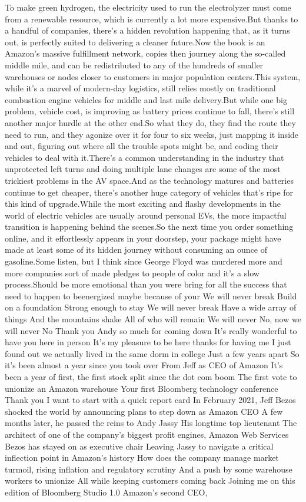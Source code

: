 \documentclass{article}%
\begin{document}
To make green hydrogen, the electricity used to run the electrolyzer must come from a renewable resource, which is currently a lot more expensive.But thanks to a handful of companies, there's a hidden revolution happening that, as it turns out, is perfectly suited to delivering a cleaner future.Now the book is an Amazon's massive fulfillment network, copies then journey along the so{-}called middle mile, and can be redistributed to any of the hundreds of smaller warehouses or nodes closer to customers in major population centers.This system, while it's a marvel of modern{-}day logistics, still relies mostly on traditional combustion engine vehicles for middle and last mile delivery.But while one big problem, vehicle cost, is improving as battery prices continue to fall, there's still another major hurdle at the other end.So what they do, they find the route they need to run, and they agonize over it for four to six weeks, just mapping it inside and out, figuring out where all the trouble spots might be, and coding their vehicles to deal with it.There's a common understanding in the industry that unprotected left turns and doing multiple lane changes are some of the most trickiest problems in the AV space.And as the technology matures and batteries continue to get cheaper, there's another huge category of vehicles that's ripe for this kind of upgrade.While the most exciting and flashy developments in the world of electric vehicles are usually around personal EVs, the more impactful transition is happening behind the scenes.So the next time you order something online, and it effortlessly appears in your doorstep, your package might have made at least some of its hidden journey without consuming an ounce of gasoline.Some listen, but I think since George Floyd was murdered more and more companies sort of made pledges to people of color and it's a slow process.Should be more emotional than you were bring for all the success that need to happen to beenergized maybe because of your We will never break Build on a foundation Strong enough to stay We will never break Have a wide array of things And the mountains shake All of who will remain We will never No, now we will never No Thank you Andy so much for coming down It's really wonderful to have you here in person It's my pleasure to be here thanks for having me I just found out we actually lived in the same dorm in college Just a few years apart So it's been almost a year since you took over From Jeff as CEO of Amazon It's been a year of first, the first stock split since the dot com boom The first vote to unionize an Amazon warehouse Your first Bloomberg technology conference Thank you I want to start with a quick report card In February 2021, Jeff Bezos shocked the world by announcing plans to step down as Amazon CEO A few months later, he passed the reins to Andy Jassy His longtime top lieutenant The architect of one of the company's biggest profit engines, Amazon Web Services Bezos has stayed on as executive chair Leaving Jassy to navigate a critical inflection point in Amazon's history How does the company manage market turmoil, rising inflation and regulatory scrutiny And a push by some warehouse workers to unionize All while keeping customers coming back Joining me on this edition of Bloomberg Studio 1.0 Amazon's second CEO, 
\end{document}
